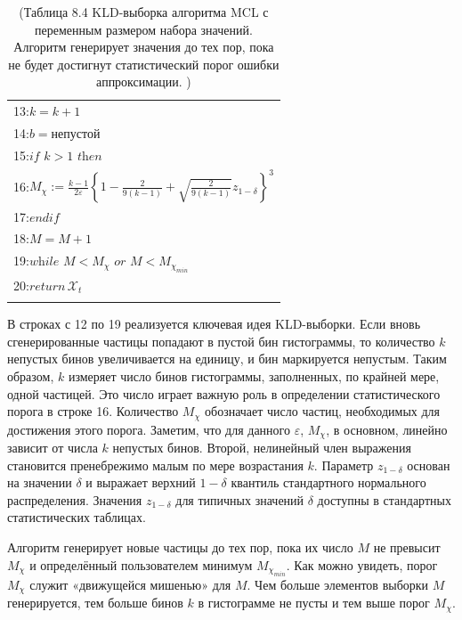 \documentclass[10pt,a4paper]{article}
\begin{document}
\begin{table}[H]
\begin{center}
\begin{tabular}{|l|}
13:\hspace{14mm}$k=k+1$\\
14:\hspace{14mm}$b=\textit{непустой}$\\
15:\hspace{14mm}$\textit{if}\,\,k>1\,\,\textit{then}$\\
16:\hspace{16mm}$M_\chi:=\frac{k-1}{2\varepsilon}\left\lbrace 1-\frac{2}{9(k-1)}+\sqrt{\frac{2}{9(k-1)}}z_{1-\delta}\right\rbrace ^3$\\
17:\hspace{9mm}$\textit{endif}$\\
18:\hspace{9mm}$M=M+1$\\
19:\hspace{4mm}$\textit{while}\,\,M<M_\chi\,\,\textit{or}\,\,M<M_{\chi_{min}}$\\
20:\hspace{4mm}$\textit{return}\,\mathcal{X}_t$\\
{}\\
\hline
\end{tabular}
\caption{(Таблица 8.4 KLD-выборка алгоритма MCL с переменным размером набора значений. Алгоритм генерирует значения до тех пор, пока не будет достигнут статистический порог ошибки аппроксимации.  )}
\end{center}
\end{table}

В строках с 12 по 19 реализуется ключевая идея KLD-выборки. Если вновь сгенерированные частицы попадают в пустой бин гистограммы,
то количество $k$ непустых бинов увеличивается на единицу, и бин маркируется непустым. Таким образом, $k$ измеряет число бинов гистограммы, заполненных, по крайней мере, одной частицей. Это число играет важную роль в определении статистического порога в строке 16. Количество $M_\chi$ обозначает число частиц, необходимых для достижения этого порога. Заметим, что для данного $\varepsilon$, $M_\chi$, в основном, линейно зависит от числа $k$ непустых бинов. Второй, нелинейный член выражения становится пренебрежимо малым по мере возрастания $k$. Параметр $z_{1-\delta}$ основан на значении $\delta$ и выражает верхний $1-\delta$ квантиль стандартного нормального распределения. Значения $z_{1-\delta}$ для типичных значений $\delta$ доступны в стандартных статистических таблицах.

Алгоритм генерирует новые частицы до тех пор, пока их число $M$ не превысит $M_\chi$ и определённый пользователем минимум $M_{\chi_{min}}$. Как можно увидеть, порог $M_\chi$ служит «движущейся мишенью» для $M$. Чем больше элементов выборки $M$ генерируется, тем больше бинов $k$ в гистограмме не пусты и тем выше порог $M_\chi$.
\end{document}
